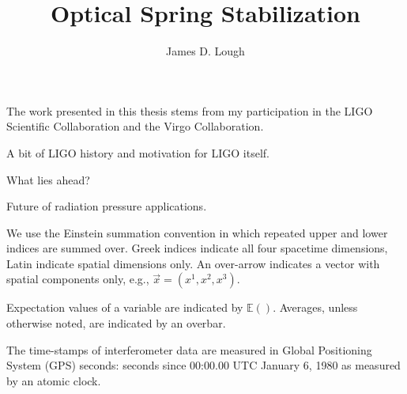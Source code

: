 \documentclass[12pt,notitlepage]{report}
\begin{document}

\title{
Optical Spring Stabilization
}
\author{James D. Lough}

\havededicationtrue
\dedication{to\\my little scientists,\\Elizabeth and Henry}
\haveminorfalse
\copyrighttrue
\doctoratetrue
\figurespagetrue
\tablespagetrue
\signedtitlepfalse

\beforepreface {}

The work presented in this thesis stems from my participation in the LIGO
Scientific Collaboration and the Virgo Collaboration.

A bit of LIGO history and motivation for LIGO itself.

What lies ahead?

Future of radiation pressure applications.


We use the Einstein summation convention in which repeated upper and lower
indices are summed over. Greek indices indicate all four spacetime dimensions,
Latin indicate spatial dimensions only. An over-arrow indicates a vector with
spatial components only, e.g., $\vec{x} = (x^1,x^2,x^3)$.

\vspace{0.5cm}

\noindent Expectation values of a variable are indicated by $\mathbb{E}()$.
Averages, unless otherwise noted, are indicated by an overbar.

\vspace{0.5cm}

\noindent The time-stamps of interferometer data are measured in
Global Positioning System (GPS) seconds: seconds since 00:00.00 UTC
January 6, 1980 as measured by an atomic clock.


\end{document}
